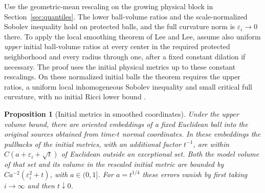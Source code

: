 \documentclass[11pt]{article}
\numberwithin{equation}{section}
\newtheorem{proposition}[theorem]{Proposition}
\theoremstyle{definition}
\theoremstyle{remark}
\renewcommand{\epsilon}{\varepsilon}
\begin{document}
Use the geometric-mean rescaling on the growing physical
block in Section~\ref{sec:quantiles}. The lower ball-volume
ratios and the scale-normalized Sobolev inequality hold on
protected balls, and the full curvature norm is \(\epsilon_i\to0\)
there. To apply the local smoothing theorem of Lee and Lee,
assume also uniform \emph{upper} initial ball-volume ratios
at every center in the required protected neighborhood and
every radius through one, after a fixed constant dilation
if necessary. The proof uses the initial physical metrics
up to these constant rescalings.
On these normalized initial balls the theorem requires the
upper ratios, a uniform local inhomogeneous Sobolev
inequality and small critical full curvature, with no initial
Ricci lower bound \cite[Theorem 1.1]{LeeLee2026Local}.

\begin{proposition}[Initial metrics in smoothed coordinates]
Under the upper volume bound, there are oriented embeddings
of a fixed Euclidean ball into the
original sources obtained from time-\(t\) normal
coordinates. In these embeddings the pullbacks of the
initial metrics, with an additional factor \(t^{-1}\),
are within \(C(a+\epsilon_i+\sqrt t)\) of Euclidean
outside an exceptional set. Both the model volume of
that set and its volume in the rescaled initial metric
are bounded by \(C a^{-2}(\epsilon_i^2+t)\), with \(a\in(0,1]\).
For \(a=t^{1/4}\) these errors vanish by first taking
\(i\to\infty\) and then \(t\downarrow0\).
\end{proposition}
\end{document}
